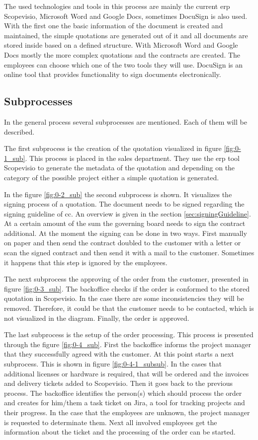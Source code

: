 The used technologies and tools in this process are mainly the current \gls{erp} Scopevisio, Microsoft Word and Google Docs, sometimes DocuSign is also used. With the first one the basic information of the document is created and maintained, the simple quotations are generated out of it and all documents are stored inside based on a defined structure. With Microsoft Word and Google Docs mostly the more complex quotations and the contracts are created. The employees can choose which one of the two tools they will use. DocuSign is an online tool that provides functionality to sign documents electronically.

\subsection*{Subprocesses}
In the general process several subprocesses are mentioned. Each of them will be described.

The first subprocess is the creation of the quotation visualized in figure \ref{fig:0-1_sub}. This process is placed in the sales department. They use the \gls{erp} tool Scopevisio to generate the metadata of the quotation and depending on the category of the possible project either a simple quotation is generated.

In the figure \ref{fig:0-2_sub} the second subprocess is shown. It visualizes the signing process of a quotation. The document needs to be signed regarding the signing guideline of \gls{cc}. An overview is given in the section \ref{sec:signingGuideline}. At a certain amount of the sum the governing board needs to sign the contract additional. At the moment the signing can be done in two ways. First manually on paper and then send the contract doubled to the customer with a letter or scan the signed contract and then send it with a mail to the customer. Sometimes it happens that this step is ignored by the employees.

The next subprocess the approving of the order from the customer, presented in figure \ref{fig:0-3_sub}. The backoffice checks if the order is conformed to the stored quotation in Scopevisio. In the case there are some inconsistencies they will be removed. Therefore, it could be that the customer needs to be contacted, which is not visualized in the diagram. Finally, the order is approved.

The last subprocess is the setup of the order processing. This process is presented through the figure \ref{fig:0-4_sub}. First the backoffice informs the project manager that they successfully agreed with the customer. At this point starts a next subprocess. This is shown in figure \ref{fig:0-4-1_subsub}. In the cases that additional licenses or hardware is required, that will be ordered and the invoices and delivery tickets added to Scopevisio. Then it goes back to the previous process. \newline
The backoffice identifies the person(s) which should process the order and creates for him/them a task ticket on Jira, a tool for tracking projects and their progress. In the case that the employees are unknown, the project manager is requested to determinate them. Next all involved employees get the information about the ticket and the processing of the order can be started.

